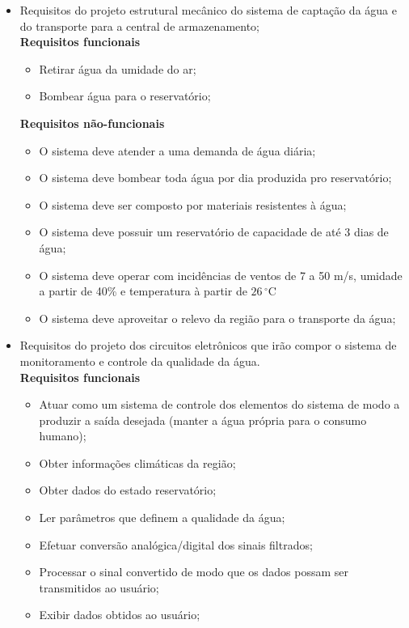       \begin{itemize}
	\item Requisitos do projeto estrutural mecânico do sistema de captação da água e do transporte para a central de armazenamento;\\
	 
	 \textbf{Requisitos funcionais}
	  \begin{itemize}
	   \item Retirar água da umidade do ar;
	   \item Bombear água para o reservatório;
	  \end{itemize}
	  
	  \textbf{Requisitos não-funcionais}
	  \begin{itemize}
	   \item O sistema deve atender a uma demanda de água diária;
	   \item O sistema deve bombear toda água por dia produzida pro reservatório; 
       \item O sistema deve ser composto por materiais resistentes à água;
       \item O sistema deve possuir um reservatório de capacidade de até 3 dias de água;
       \item O sistema deve operar com incidências de ventos de 7 a 50 m/s, umidade a partir de 40\% e 	temperatura à partir de $26\,^{\circ}\mathrm{C}$\cite{eole}
       \item O sistema deve aproveitar o relevo da região para o transporte da água;

	  \end{itemize}
	  
	\item Requisitos do projeto dos circuitos eletrônicos que irão compor o sistema de monitoramento e controle da qualidade da água.\\
	 
	 \textbf{Requisitos funcionais}
	  \begin{itemize}
	   \item Atuar como um sistema de controle dos elementos do sistema de modo a produzir a saída desejada (manter a água própria para o consumo humano);
	   \item Obter informações climáticas da região;
	   \item Obter dados do estado reservatório;
	   \item Ler parâmetros que definem a qualidade da água;
	   \item Efetuar conversão analógica/digital dos sinais filtrados;
	   \item Processar o sinal convertido de modo que os dados possam ser transmitidos ao usuário;
	   \item Exibir dados obtidos ao usuário;
	  \end{itemize}
	  

\end{itemize}
